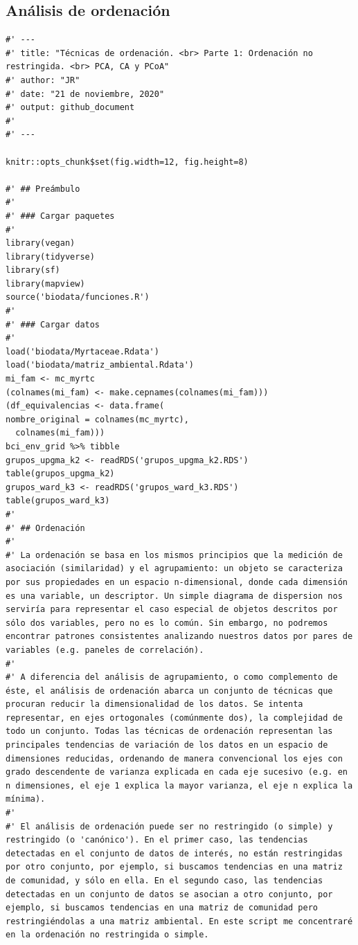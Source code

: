 \documentclass[11pt,]{article}
\begin{document}
\subsection{Análisis de ordenación}\label{anuxe1lisis-de-ordenaciuxf3n}

\begin{verbatim}
#' ---
#' title: "Técnicas de ordenación. <br> Parte 1: Ordenación no restringida. <br> PCA, CA y PCoA"
#' author: "JR"
#' date: "21 de noviembre, 2020"
#' output: github_document
#' 
#' ---

knitr::opts_chunk$set(fig.width=12, fig.height=8)

#' ## Preámbulo
#' 
#' ### Cargar paquetes
#' 
library(vegan)
library(tidyverse)
library(sf)
library(mapview)
source('biodata/funciones.R')
#' 
#' ### Cargar datos
#' 
load('biodata/Myrtaceae.Rdata')
load('biodata/matriz_ambiental.Rdata')
mi_fam <- mc_myrtc
(colnames(mi_fam) <- make.cepnames(colnames(mi_fam)))
(df_equivalencias <- data.frame(
nombre_original = colnames(mc_myrtc),
  colnames(mi_fam)))
bci_env_grid %>% tibble
grupos_upgma_k2 <- readRDS('grupos_upgma_k2.RDS')
table(grupos_upgma_k2)
grupos_ward_k3 <- readRDS('grupos_ward_k3.RDS')
table(grupos_ward_k3)
#' 
#' ## Ordenación
#' 
#' La ordenación se basa en los mismos principios que la medición de asociación (similaridad) y el agrupamiento: un objeto se caracteriza por sus propiedades en un espacio n-dimensional, donde cada dimensión es una variable, un descriptor. Un simple diagrama de dispersion nos serviría para representar el caso especial de objetos descritos por sólo dos variables, pero no es lo común. Sin embargo, no podremos encontrar patrones consistentes analizando nuestros datos por pares de variables (e.g. paneles de correlación).
#' 
#' A diferencia del análisis de agrupamiento, o como complemento de éste, el análisis de ordenación abarca un conjunto de técnicas que procuran reducir la dimensionalidad de los datos. Se intenta representar, en ejes ortogonales (comúnmente dos), la complejidad de todo un conjunto. Todas las técnicas de ordenación representan las principales tendencias de variación de los datos en un espacio de dimensiones reducidas, ordenando de manera convencional los ejes con grado descendente de varianza explicada en cada eje sucesivo (e.g. en n dimensiones, el eje 1 explica la mayor varianza, el eje n explica la mínima).
#' 
#' El análisis de ordenación puede ser no restringido (o simple) y restringido (o 'canónico'). En el primer caso, las tendencias detectadas en el conjunto de datos de interés, no están restringidas por otro conjunto, por ejemplo, si buscamos tendencias en una matriz de comunidad, y sólo en ella. En el segundo caso, las tendencias detectadas en un conjunto de datos se asocian a otro conjunto, por ejemplo, si buscamos tendencias en una matriz de comunidad pero restringiéndolas a una matriz ambiental. En este script me concentraré en la ordenación no restringida o simple.

\end{verbatim}
\end{document}
